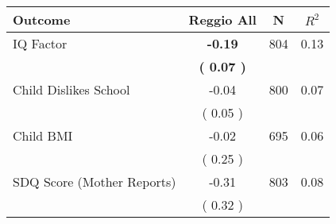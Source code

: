 \begin{tabular}{lccc}
\toprule
 \textbf{Outcome} & \textbf{Reggio All} & \textbf{N} & \textbf{$ R^2$} \\
\midrule
IQ Factor & \textbf{    -0.19} & 804 &      0.13 \\ 
 & \textbf{(     0.07 )} & \\
Child Dislikes School &     -0.04 & 800 &      0.07 \\ 
 & (     0.05 ) & \\
Child BMI &     -0.02 & 695 &      0.06 \\ 
 & (     0.25 ) & \\
SDQ Score (Mother Reports) &     -0.31 & 803 &      0.08 \\ 
 & (     0.32 ) & \\
\bottomrule
\end{tabular}
